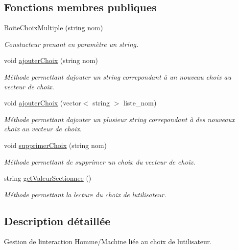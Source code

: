\subsection*{Fonctions membres publiques}
\begin{DoxyCompactItemize}
\item 
\hyperlink{class_boite_choix_multiple_a33c5d1f1b62448952ea8503cdb7ade50}{Boite\+Choix\+Multiple} (string nom)
\begin{DoxyCompactList}\small\item\em Constucteur prenant en paramètre un string. \end{DoxyCompactList}\item 
void \hyperlink{class_boite_choix_multiple_aa0acac137fd87665bc4225e1eec6e387}{ajouter\+Choix} (string nom)
\begin{DoxyCompactList}\small\item\em Méthode permettant d\textquotesingle{}ajouter un string correpondant à un nouveau choix au vecteur de choix. \end{DoxyCompactList}\item 
void \hyperlink{class_boite_choix_multiple_a52c59e771b17233ba4e1816907a68284}{ajouter\+Choix} (vector$<$ string $>$ liste\+\_\+nom)
\begin{DoxyCompactList}\small\item\em Méthode permettant d\textquotesingle{}ajouter un plusieur string correpondant à des nouveaux choix au vecteur de choix. \end{DoxyCompactList}\item 
void \hyperlink{class_boite_choix_multiple_ab37e456d084fb9e70d7e24df0839916f}{supprimer\+Choix} (string nom)
\begin{DoxyCompactList}\small\item\em Méthode permettant de supprimer un choix du vecteur de choix. \end{DoxyCompactList}\item 
string \hyperlink{class_boite_choix_multiple_a3766802fe49f850dbda7a6bdbcb2d5d7}{get\+Valeur\+Sectionnee} ()
\begin{DoxyCompactList}\small\item\em Méthode permettant la lecture du choix de l\textquotesingle{}utilisateur. \end{DoxyCompactList}\end{DoxyCompactItemize}


\subsection{Description détaillée}
Gestion de l\textquotesingle{}interaction Homme/\+Machine liée au choix de l\textquotesingle{}utilisateur. 

